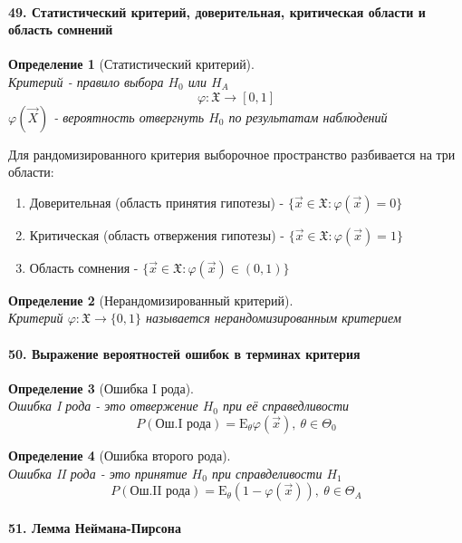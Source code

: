 \documentclass[titlepage]{article}
\newcommand{\sX}{\mathfrak{X}}
\newcommand{\sE}{\mathrm{E}}
\newtheorem{definition}{Определение}
\begin{document}
\paragraph{49. Статистический критерий, доверительная, критическая области и область сомнений}
\begin{definition}[Статистический критерий] ~\\
	Критерий - правило выбора $H_0$ или $H_A$
	\[\varphi: \sX \rightarrow [0,1]\]
	$\varphi(\vec X)$ - вероятность отвергнуть $H_0$ по результатам наблюдений
\end{definition}
Для рандомизированного критерия выборочное пространство разбивается на три области:
\begin{enumerate}
	\item Доверительная (область принятия гипотезы) - $\{\vec x \in \sX: \varphi(\vec x) = 0\}$
	\item Критическая (область отвержения гипотезы) - $\{\vec x \in \sX: \varphi(\vec x) = 1\}$
	\item Область сомнения - $\{\vec x \in \sX: \varphi(\vec x) \in (0,1)\}$
\end{enumerate}
\begin{definition}[Нерандомизированный критерий] ~\\
	Критерий $\varphi: \sX \rightarrow \{0,1\}$ называется нерандомизированным критерием
\end{definition}

\paragraph{50. Выражение вероятностей ошибок в терминах критерия}
\begin{definition}[Ошибка I рода] ~\\
	Ошибка I рода - это отвержение $H_0$ при её справедливости
	\[P(\text{Ош.I рода}) = \sE_\theta\varphi(\vec x),\ \theta \in \Theta_0\]
\end{definition}
\begin{definition}[Ошибка второго рода] ~\\
	Ошибка II рода - это принятие $H_0$ при справделивости $H_1$
	\[P(\text{Ош.II рода}) = \sE_\theta(1-\varphi(\vec x)),\ \theta \in \Theta_A\]
\end{definition}

\paragraph{51. Лемма Неймана-Пирсона}
\end{document}
